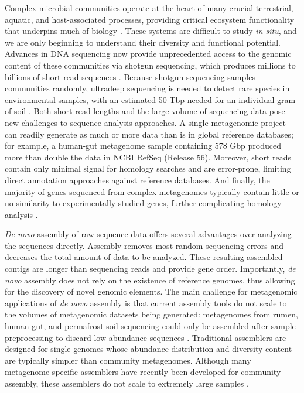 \documentclass{nature}%
\begin{document}
Complex microbial communities operate at the heart of many crucial
terrestrial, aquatic, and host-associated processes, providing
critical ecosystem functionality that underpins much of biology
\cite{Arumugam:2011p735,Hess:2011p686,Iverson:2012p1281,
  Mackelprang:2011p1087,Qin:2010p189,Tringe:2005p174,Venter:2004p170}.
These systems are difficult to study {\em in situ}, and we are only
beginning to understand their diversity and functional potential.
Advances in DNA sequencing now provide unprecedented
access to the genomic content of these communities via shotgun
sequencing, which produces millions to billions of short-read
sequences \cite{Hess:2011p686,Mackelprang:2011p1087,Qin:2010p189}.
Because shotgun sequencing samples communities randomly, ultradeep
sequencing is needed to detect rare species in environmental samples,
with an estimated 50 Tbp needed for an individual gram of soil
\cite{Gans:2005p1365}.  Both short read lengths and the large volume
of sequencing data pose new challenges to sequence analysis
approaches.  A single metagenomic project can readily generate as much
or more data than is in global reference databases; for example, a
human-gut metagenome sample containing 578 Gbp \cite{Qin:2010p189}
produced more than double the data in NCBI RefSeq
(Release 56).  Moreover, short reads contain only minimal
signal for homology searches and are error-prone, limiting direct
annotation approaches against reference databases.  And finally, the
majority of genes sequenced from complex metagenomes typically contain little or no
similarity to experimentally studied genes, further complicating
homology analysis \cite{Arumugam:2011p735,Qin:2010p189}.

\emph{De novo} assembly of raw sequence data offers several advantages
over analyzing the sequences directly.  Assembly removes most random
sequencing errors and decreases the total amount of data to be
analyzed.  These resulting assembled contigs are longer than
sequencing reads and provide gene order.  Importantly, \emph{de novo}
assembly does not rely on the existence of reference genomes, thus
allowing for the discovery of novel genomic elements.  The main challenge for
metagenomic applications of \emph{de novo} assembly is that current
assembly tools do not scale to the volumes of metagenomic datasets
being generated: metagenomes from rumen, human gut, and permafrost
soil sequencing could only be assembled after sample preprocessing to
discard low abundance sequences
\cite{Hess:2011p686,Mackelprang:2011p1087,Qin:2010p189}.  Traditional
assemblers are designed for single genomes whose abundance
distribution and diversity content are typically simpler than
community metagenomes.  Although many metagenome-specific assemblers
have recently been developed for community assembly, these assemblers
do not scale to extremely large samples \cite{Scholz:2012p1372}.
\end{document}
